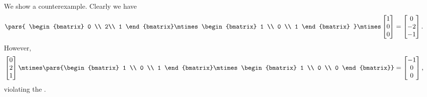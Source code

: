 \begin{solution}
    We show a counterexample.
    Clearly we have
    \begin{equation}
        \pars{
            \begin{bmatrix}
                0 \\ 2\\ 1
            \end{bmatrix}\mtimes
            \begin{bmatrix}
                1 \\ 0 \\ 1
            \end{bmatrix}
        }
        \mtimes
        \begin{bmatrix}
            1 \\ 0 \\ 0
        \end{bmatrix}
        =
        \begin{bmatrix}
            0 \\-2\\-1
        \end{bmatrix}.
    \end{equation}
    However,
    \begin{equation}
        \begin{bmatrix}
            0 \\ 2\\ 1
        \end{bmatrix}\mtimes \pars{\begin{bmatrix}
                1 \\ 0 \\ 1
            \end{bmatrix}\mtimes
            \begin{bmatrix}
                1 \\ 0 \\ 0
            \end{bmatrix}}
        =\begin{bmatrix}
            -1 \\0\\0
        \end{bmatrix},
    \end{equation}
    violating the .
\end{solution}


